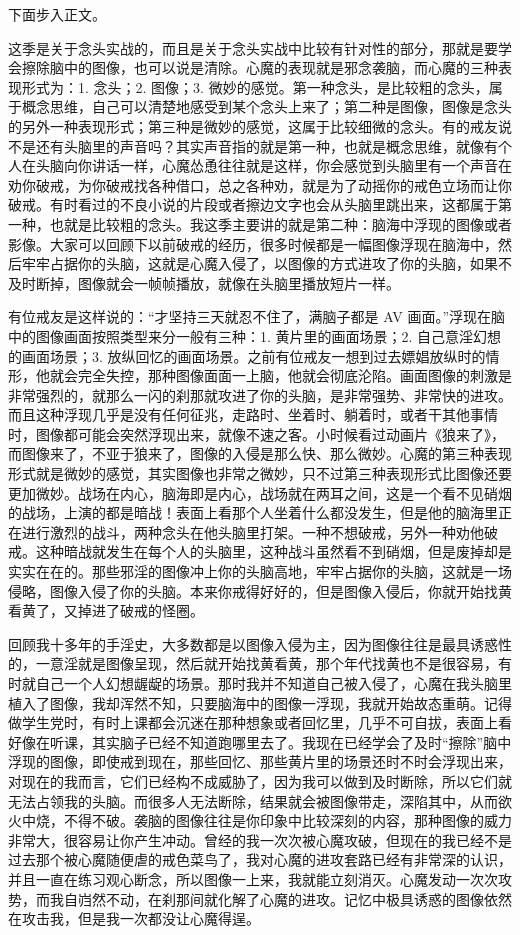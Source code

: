 下面步入正文。

这季是关于念头实战的，而且是关于念头实战中比较有针对性的部分，那就是要学会擦除脑中的图像，也可以说是清除。心魔的表现就是邪念袭脑，而心魔的三种表现形式为：1. 念头；2. 图像；3. 微妙的感觉。第一种念头，是比较粗的念头，属于概念思维，自己可以清楚地感受到某个念头上来了；第二种是图像，图像是念头的另外一种表现形式；第三种是微妙的感觉，这属于比较细微的念头。有的戒友说不是还有头脑里的声音吗？其实声音指的就是第一种，也就是概念思维，就像有个人在头脑向你讲话一样，心魔怂恿往往就是这样，你会感觉到头脑里有一个声音在劝你破戒，为你破戒找各种借口，总之各种劝，就是为了动摇你的戒色立场而让你破戒。有时看过的不良小说的片段或者擦边文字也会从头脑里跳出来，这都属于第一种，也就是比较粗的念头。我这季主要讲的就是第二种：脑海中浮现的图像或者影像。大家可以回顾下以前破戒的经历，很多时候都是一幅图像浮现在脑海中，然后牢牢占据你的头脑，这就是心魔入侵了，以图像的方式进攻了你的头脑，如果不及时断掉，图像就会一帧帧播放，就像在头脑里播放短片一样。

有位戒友是这样说的：“才坚持三天就忍不住了，满脑子都是 AV 画面。”浮现在脑中的图像画面按照类型来分一般有三种：1. 黄片里的画面场景；2. 自己意淫幻想的画面场景；3. 放纵回忆的画面场景。之前有位戒友一想到过去嫖娼放纵时的情形，他就会完全失控，那种图像面面一上脑，他就会彻底沦陷。画面图像的刺激是非常强烈的，就那么一闪的刹那就攻进了你的头脑，是非常强势、非常快的进攻。而且这种浮现几乎是没有任何征兆，走路时、坐着时、躺着时，或者干其他事情时，图像都可能会突然浮现出来，就像不速之客。小时候看过动画片《狼来了》，而图像来了，不亚于狼来了，图像的入侵是那么快、那么微妙。心魔的第三种表现形式就是微妙的感觉，其实图像也非常之微妙，只不过第三种表现形式比图像还要更加微妙。战场在内心，脑海即是内心，战场就在两耳之间，这是一个看不见硝烟的战场，上演的都是暗战！表面上看那个人坐着什么都没发生，但是他的脑海里正在进行激烈的战斗，两种念头在他头脑里打架。一种不想破戒，另外一种劝他破戒。这种暗战就发生在每个人的头脑里，这种战斗虽然看不到硝烟，但是废掉却是实实在在的。那些邪淫的图像冲上你的头脑高地，牢牢占据你的头脑，这就是一场侵略，图像入侵了你的头脑。本来你戒得好好的，但是图像入侵后，你就开始找黄看黄了，又掉进了破戒的怪圈。

回顾我十多年的手淫史，大多数都是以图像入侵为主，因为图像往往是最具诱惑性的，一意淫就是图像呈现，然后就开始找黄看黄，那个年代找黄也不是很容易，有时就自己一个人幻想龌龊的场景。那时我并不知道自己被入侵了，心魔在我头脑里植入了图像，我却浑然不知，只要脑海中的图像一浮现，我就开始故态重萌。记得做学生党时，有时上课都会沉迷在那种想象或者回忆里，几乎不可自拔，表面上看好像在听课，其实脑子已经不知道跑哪里去了。我现在已经学会了及时“擦除”脑中浮现的图像，即使戒到现在，那些回忆、那些黄片里的场景还时不时会浮现出来，对现在的我而言，它们已经构不成威胁了，因为我可以做到及时断除，所以它们就无法占领我的头脑。而很多人无法断除，结果就会被图像带走，深陷其中，从而欲火中烧，不得不破。袭脑的图像往往是你印象中比较深刻的内容，那种图像的威力非常大，很容易让你产生冲动。曾经的我一次次被心魔攻破，但现在的我已经不是过去那个被心魔随便虐的戒色菜鸟了，我对心魔的进攻套路已经有非常深的认识，并且一直在练习观心断念，所以图像一上来，我就能立刻消灭。心魔发动一次次攻势，而我自岿然不动，在刹那间就化解了心魔的进攻。记忆中极具诱惑的图像依然在攻击我，但是我一次都没让心魔得逞。

